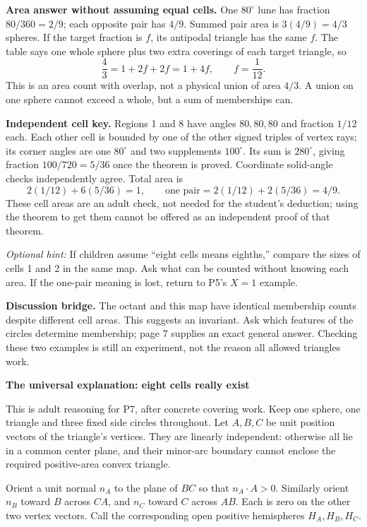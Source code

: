 \documentclass[11pt,letterpaper]{article}
\newcommand{\topic}[1]{\par{\large\bfseries\color{blue}#1}\par}
\newcommand{\hint}[1]{\textit{Optional hint:} #1\par}
\newcommand{\degc}{^\circ}
\begin{document}
\textbf{Area answer without assuming equal cells.} One $80\degc$ lune has fraction $80/360=2/9$; each opposite pair has $4/9$. Summed pair area is $3(4/9)=4/3$ spheres. If the target fraction is $f$, its antipodal triangle has the same $f$. The table says one whole sphere plus two extra coverings of each target triangle, so
\[
 \frac43=1+2f+2f=1+4f,\qquad f=\frac1{12}.
\]
This is an area count with overlap, not a physical union of area $4/3$. A union on one sphere cannot exceed a whole, but a sum of memberships can.

\textbf{Independent cell key.} Regions 1 and 8 have angles $80,80,80$ and fraction $1/12$ each. Each other cell is bounded by one of the other signed triples of vertex rays; its corner angles are one $80\degc$ and two supplements $100\degc$. Its sum is $280\degc$, giving fraction $100/720=5/36$ once the theorem is proved. Coordinate solid-angle checks independently agree. Total area is
\[
 2(1/12)+6(5/36)=1,
 \qquad\text{one pair}=2(1/12)+2(5/36)=4/9.
\]
These cell areas are an adult check, not needed for the student's deduction; using the theorem to get them cannot be offered as an independent proof of that theorem.

\hint{If children assume ``eight cells means eighths,'' compare the sizes of cells 1 and 2 in the same map. Ask what can be counted without knowing each area. If the one-pair meaning is lost, return to P5's $X=1$ example.}
\textbf{Discussion bridge.} The octant and this map have identical membership counts despite different cell areas. This suggests an invariant. Ask which features of the circles determine membership; page 7 supplies an exact general answer. Checking these two examples is still an experiment, not the reason all allowed triangles work.

\newpage
\topic{The universal explanation: eight cells really exist}
This is adult reasoning for P7, after concrete covering work. Keep one sphere, one triangle and three fixed side circles throughout. Let $A,B,C$ be unit position vectors of the triangle's vertices. They are linearly independent: otherwise all lie in a common center plane, and their minor-arc boundary cannot enclose the required positive-area convex triangle.

Orient a unit normal $n_A$ to the plane of $BC$ so that $n_A\cdot A>0$. Similarly orient $n_B$ toward $B$ across $CA$, and $n_C$ toward $C$ across $AB$. Each is zero on the other two vertex vectors. Call the corresponding open positive hemispheres $H_A,H_B,H_C$.
\end{document}
